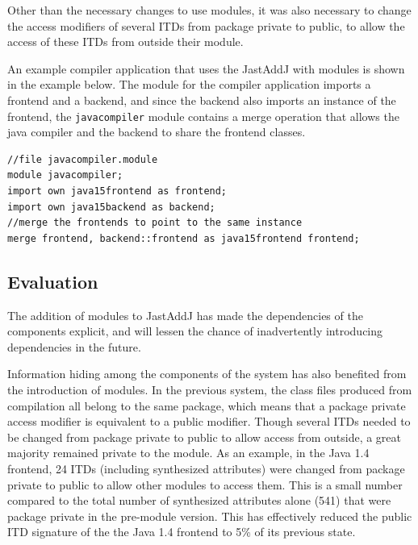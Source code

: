 Other than the necessary changes to use modules, it was also necessary to change the 
access modifiers of several ITDs from package private to public, to allow the 
access of these ITDs from outside their module. 

An example compiler application that uses the JastAddJ with modules is shown in the example below.
The module for the compiler application imports a frontend and a backend, and since the backend 
also imports an instance of the frontend, the \texttt{javacompiler} module contains a merge
operation that allows the java compiler and the backend to share the frontend classes.

\begin{lstlisting}[caption={JastAddJ Compiler Application}]
//file javacompiler.module
module javacompiler;
import own java15frontend as frontend;
import own java15backend as backend;
//merge the frontends to point to the same instance
merge frontend, backend::frontend as java15frontend frontend;
\end{lstlisting}

\subsection{Evaluation}

The addition of modules to JastAddJ has made the dependencies of the components
explicit, and will lessen the chance of inadvertently introducing dependencies 
in the future. 

Information hiding among the components of the system has also benefited from
the introduction of modules. In the previous system, the class files produced from
compilation all belong to the same package, which means that a package private access modifier
is equivalent to a public modifier. Though several ITDs needed to be changed from 
package private to public to allow access from outside, a great majority remained private to
the module. As an example, in the Java 1.4 frontend, 24 ITDs (including synthesized attributes)
were changed from package private to public to allow other modules to access them. This is a small number 
compared to the total number of synthesized attributes alone (541) that were package private in the pre-module version.
This has effectively reduced the public ITD signature of the the Java 1.4 frontend to 5\% of its previous state.

